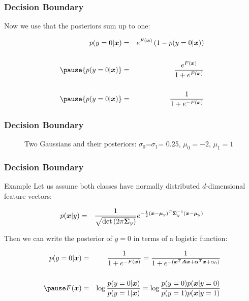 \begin{frame}
  \frametitle{Decision Boundary \cont}
 
  Now we use that the posteriors sum up to one:
  
  \begin{eqnarray*}
    {p(y=0|\vec{x})}&=& e^{F(\vec x)}\left( {1-p(y=0|\vec x)}\right) \\ \\
    \pause {p(y=0|\vec{x})}&=& \frac{e^{F(\vec x)}}{1+e^{F(\vec x)}} \\ \\
    \pause {p(y=0|\vec{x})}&=& \frac{1}{1+e^{-F(\vec x)}} 
  \end{eqnarray*} 
\end{frame}


\begin{frame}
  \frametitle{Decision Boundary \cont}
 
  \begin{figure}
    \caption{Two Gaussians and their posteriors: {\color{bl3} $\sigma_0$}={\color{gr3}$ \sigma_1$}= 0.25,  {\color{bl3} $\mu_0=-2$},
              {\color{gr3} $\mu_1=1$}}
    \label{f:logit}
  \end{figure}
\end{frame}


\begin{frame}
  \frametitle{Decision Boundary \cont}
  
  \begin{ovalblock}{Example}
    \footnotesize
    Let us assume both classes have normally distributed $d$-dimensional feature vectors:
 
    \begin{eqnarray*}
      p({\bm x} | y) &=& \frac{1}{ \sqrt{ \det{(2 \pi \ensuremath{{\bm \Sigma}}_y})} } 
                        e^{-\frac{1}{2} ({\bm x} - {\bm \mu}_y)^T {\bm \Sigma}_y^{-1} ({\bm x} - {\bm \mu}_y)  }
    \end{eqnarray*}
    \pause
 
    Then we can write the posterior of $y=0$ in terms of a logistic function:
 
    \begin{eqnarray*}
      p(y=0|\vec x) &=& \frac{1}{1+e^{-F(\vec x)}} = \frac{1}{1+e^{ - \left( \vec x^T \mat A \vec x + \vec \alpha^T\vec x + \alpha_0 \right) } } \\ \\
      \pause F(\vec x) &=& \log \frac{p(y=0|\vec x)}{p(y=1|\vec x)} = \log \frac{p(y=0)p(\vec x | y=0) }{p(y=1)p(\vec x|y =1)}
    \end{eqnarray*}
  \end{ovalblock}
\end{frame}


